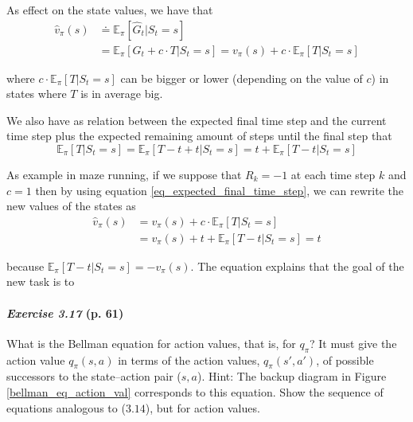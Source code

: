 \documentclass[10pt,a4paper]{article}
\begin{document}
As effect on the state values, we have that
\begin{equation}
\begin{split}
\hat{v}_\pi(s) &\doteq \mathbb{E}_\pi[\hat{G}_t \lvert S_t = s]\\
&= \mathbb{E}_\pi[ G_t + c \cdot T \lvert S_t = s] = v_\pi(s) + c \cdot \mathbb{E}_\pi[T \lvert S_t = s]
\end{split}
\end{equation}

where $c \cdot \mathbb{E}_\pi[T \lvert S_t = s]$ can be bigger or lower (depending on the value of $c$) in states where $T$ is in average big.

We also have as relation between the expected final time step and the current time step plus the expected remaining amount of steps until the final step that 
\begin{equation}\label{eq_expected_final_time_step}
\mathbb{E}_\pi[T \lvert S_t = s] = \mathbb{E}_\pi[T - t + t \lvert S_t = s] = t + \mathbb{E}_\pi[T - t \lvert S_t = s]
\end{equation}

As example in maze running, if we suppose that $R_k = -1$ at each time step $k$ and $c = 1$ then by using equation \ref{eq_expected_final_time_step}, we can rewrite the new values of the states as
\begin{equation}
\begin{split}
\hat{v}_\pi(s) &= v_\pi(s) + c \cdot \mathbb{E}_\pi[T \lvert S_t = s]\\
&= v_\pi(s) + t + \mathbb{E}_\pi[T - t \lvert S_t = s] = t
\end{split}
\end{equation}

because $\mathbb{E}_\pi[T - t \lvert S_t = s] = -v_\pi(s)$. The equation explains that the goal of the new task is to 


\clearpage
\paragraph{\textit{Exercise 3.17} (p. 61)} What is the Bellman equation for action values, that is, for $q_\pi$? It must give the action value $q_\pi(s, a)$ in terms of the action values, $q_\pi(s', a')$, of possible successors to the state–action pair ($s, a$).
Hint: The backup diagram in Figure  \ref{bellman_eq_action_val} corresponds to this equation.
Show the sequence of equations analogous to ($3.14$), but for action
values.
\end{document}
